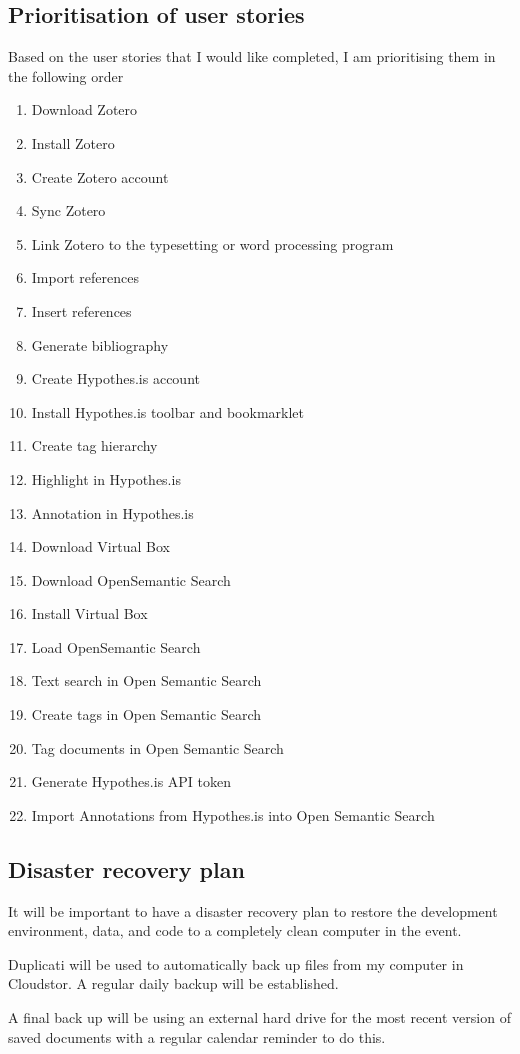 \documentclass{article}
\begin{document}
\subsection*{Prioritisation of user stories}

Based on the user stories that I would like completed, I am prioritising them in the following order

\begin{enumerate}
    \item Download Zotero
    \item Install Zotero
    \item Create Zotero account
    \item Sync Zotero
    \item Link Zotero to the typesetting or word processing program
    \item Import references
    \item Insert references
    \item Generate bibliography
    \item Create Hypothes.is account
    \item Install Hypothes.is toolbar and bookmarklet
    \item Create tag hierarchy
    \item Highlight in Hypothes.is
    \item Annotation in Hypothes.is
    \item Download Virtual Box
    \item Download OpenSemantic Search
    \item Install Virtual Box
    \item Load OpenSemantic Search
    \item Text search in Open Semantic Search
    \item Create tags in Open Semantic Search
    \item Tag documents in Open Semantic Search
    \item Generate Hypothes.is API token
    \item Import Annotations from Hypothes.is into Open Semantic Search

\end{enumerate}

\subsection*{Disaster recovery plan}

It will be important to have a disaster recovery plan to restore the development environment, data, and code to a completely clean computer in the event.

Duplicati will be used to automatically back up files from my computer in Cloudstor. A regular daily backup will be established.

A final back up will be using an external hard drive for the most recent version of saved documents with a regular calendar reminder to do this. 
\end{document}
